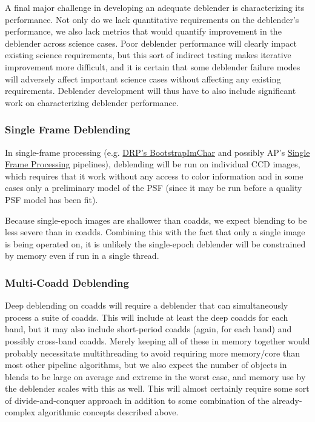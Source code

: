 A final major challenge in developing an adequate deblender is characterizing its performance.  Not only do we lack quantitative requirements on the deblender's performance, we also lack metrics that would quantify improvement in the deblender across science cases.  Poor deblender performance will clearly impact existing science requirements, but this sort of indirect testing makes iterative improvement more difficult, and it is certain that some deblender failure modes will adversely affect important science cases without affecting any existing requirements.  Deblender development will thus have to also include significant work on characterizing deblender performance.


\subsubsection{Single Frame Deblending}
\label{sec:acSingleFrameDeblending}

In single-frame processing (e.g. \hyperref[sec:drpBootstrapImChar]{DRP's BootstrapImChar} and possibly AP's \hyperref[sec:apSingleFrameProcessing]{Single Frame Processing} pipelines), deblending will be run on individual CCD images, which requires that it work without any access to color information and in some cases only a preliminary model of the PSF (since it may be run before a quality PSF model has been fit).

Because single-epoch images are shallower than coadds, we expect blending to be less severe than in coadds.  Combining this with the fact that only a single image is being operated on, it is unlikely the single-epoch deblender will be constrained by memory even if run in a single thread.

\subsubsection{Multi-Coadd Deblending}
\label{sec:acMultiCoaddDeblending}

Deep deblending on coadds will require a deblender that can simultaneously process a suite of coadds.  This will include at least the deep coadds for each band, but it may also include short-period coadds (again, for each band) and possibly cross-band coadds.  Merely keeping all of these in memory together would probably necessitate multithreading to avoid requiring more memory/core than most other pipeline algorithms, but we also expect the number of objects in blends to be large on average and extreme in the worst case, and memory use by the deblender scales with this as well.  This will almost certainly require some sort of divide-and-conquer approach in addition to some combination of the already-complex algorithmic concepts described above.

